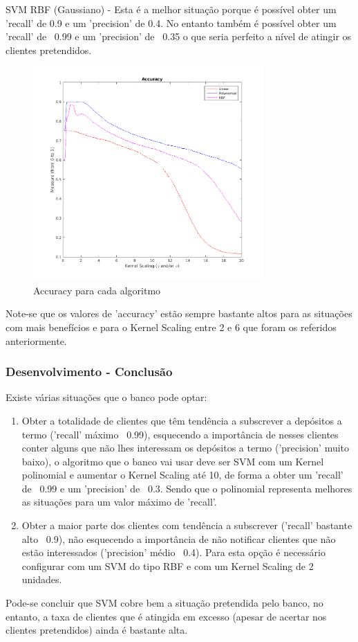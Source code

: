 \documentclass[portugues,final]{revdetua}
\begin{document}
SVM RBF (Gaussiano) - Esta é a melhor situação porque é possível obter um 'recall' de 0.9 e um 'precision' de 0.4. No entanto também é possível obter um 'recall' de ~0.99 e um 'precision' de ~0.35 o que seria perfeito a nível de atingir os clientes pretendidos.\\

\begin{figure}[H]
\centerline{\includegraphics[width=250pt]{images/svm_accuracy.png}}
\caption{Accuracy para cada algoritmo}
\label{img:complete}
\end{figure}

Note-se que os valores de 'accuracy' estão sempre bastante altos para as situações com mais benefícios e para o Kernel Scaling entre 2 e 6 que foram os referidos anteriormente.

\subsubsection{Desenvolvimento - Conclusão}

Existe várias situações que o banco pode optar:
\begin{enumerate}
\item Obter a totalidade de clientes que têm tendência a subscrever a depósitos a termo ('recall' máximo ~0.99), esquecendo a importância de nesses clientes conter alguns que não lhes interessam os depósitos a termo ('precision' muito baixo), o algoritmo que o banco vai usar deve ser SVM com um Kernel polinomial e aumentar o Kernel Scaling até 10, de forma a obter um 'recall' de ~0.99 e um 'precision' de ~0.3. Sendo que o polinomial representa melhores as situações para um valor máximo de 'recall'.
\item Obter a maior parte dos clientes com tendência a subscrever ('recall' bastante alto ~0.9), não esquecendo a importância de não notificar clientes que não estão interessados ('precision' médio ~0.4). Para esta opção é necessário configurar com um SVM do tipo RBF e com um Kernel Scaling de 2 unidades.
\end{enumerate}

Pode-se concluir que SVM cobre bem a situação pretendida pelo banco, no entanto, a taxa de clientes que é atingida em excesso (apesar de acertar nos clientes pretendidos) ainda é bastante alta.

\end{document}
